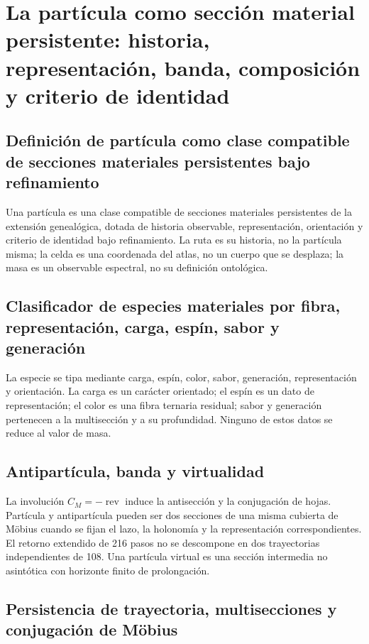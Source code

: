 \chapter{La partícula como sección material persistente: historia, representación, banda, composición y criterio de identidad}
\label{chap:particula-seccion-material-persistente}

\section{Definición de partícula como clase compatible de secciones materiales persistentes bajo refinamiento}
Una partícula es una clase compatible de secciones materiales persistentes de
la extensión genealógica, dotada de historia observable, representación,
orientación y criterio de identidad bajo refinamiento. La ruta es su historia,
no la partícula misma; la celda es una coordenada del atlas, no un cuerpo que
se desplaza; la masa es un observable espectral, no su definición ontológica.

\section{Clasificador de especies materiales por fibra, representación, carga, espín, sabor y generación}
La especie se tipa mediante carga, espín, color, sabor, generación,
representación y orientación. La carga es un carácter orientado; el espín es
un dato de representación; el color es una fibra ternaria residual; sabor y
generación pertenecen a la multisección y a su profundidad. Ninguno de estos
datos se reduce al valor de masa.

\section{Antipartícula, banda y virtualidad}
La involución \(C_M=-\operatorname{rev}\) induce la antisección y la
conjugación de hojas. Partícula y antipartícula pueden ser dos secciones de una
misma cubierta de Möbius cuando se fijan el lazo, la holonomía y la
representación correspondientes. El retorno extendido de 216 pasos no se
descompone en dos trayectorias independientes de 108. Una partícula virtual es
una sección intermedia no asintótica con horizonte finito de prolongación.

\section{Persistencia de trayectoria, multisecciones y conjugación de Möbius}

